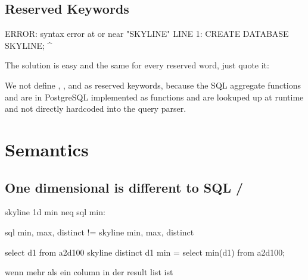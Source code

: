 \subsection{Reserved Keywords}

\begin{sqlscript}

ERROR:  syntax error at or near "SKYLINE"
LINE 1: CREATE DATABASE SKYLINE;
                        ^
\end{sqlscript}
The solution is easy and the same for every reserved word, just quote it:
\begin{sqlscript}
\end{sqlscript}

We not define , , and  as reserved keywords, because the SQL aggregate functions  and  are in PostgreSQL implemented as functions and are lookuped up at runtime and not directly hardcoded into the query parser.

\section{Semantics}

\subsection{One dimensional  is different to SQL /}

skyline 1d min neq sql min:

sql min, max, distinct != skyline min, max, distinct


select d1 from a2d100 skyline distinct d1 min = select min(d1) from a2d100;


wenn mehr als ein column in der result list ist



